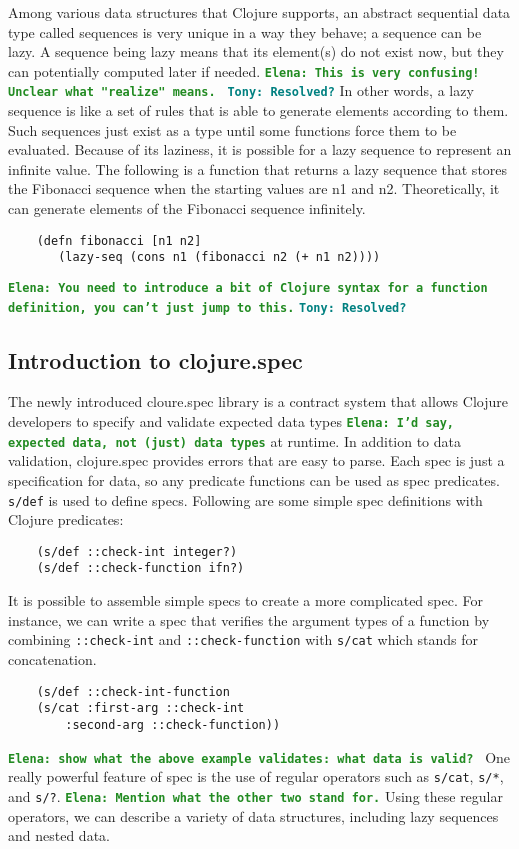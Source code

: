 \documentclass[12pt]{article}
\newcommand{\comment}[1]{{\bf \tt  {#1}}}
\newcommand{\emcomment}[1]{\textcolor{ForestGreen}{\comment{Elena: {#1}}}}
\newcommand{\tscomment}[1]{\textcolor{Teal}{\comment{Tony: {#1}}}}
\begin{document}
	Among various data structures that Clojure supports, an abstract sequential data type called sequences is very unique in 
	a way they behave; a sequence can be lazy. A sequence being lazy means that its element(s) do not exist now, but they 
	can potentially computed later if needed. 
	\emcomment{This is very confusing! Unclear what "realize" means. } \tscomment{Resolved?}
	In other words, a lazy sequence is like a set of rules that is able to generate elements according to them.
	Such sequences just exist as a type until some functions force them to be evaluated. Because of its laziness, it is possible 
	for a lazy sequence to represent an infinite value. The following is a function that returns a lazy sequence that stores the 
	Fibonacci sequence when the starting values are n1 and n2. Theoretically, it can generate elements of the Fibonacci 
	sequence infinitely. 
	\begin{verbatim}
	(defn fibonacci [n1 n2]
	   (lazy-seq (cons n1 (fibonacci n2 (+ n1 n2))))
	\end{verbatim}
	\emcomment{You need to introduce a bit of Clojure syntax for a function definition, you can't just jump to this.}
	\tscomment{Resolved?}
	
	\subsection{Introduction to clojure.spec}
	The newly introduced cloure.spec library is a contract system that allows Clojure developers to specify and validate expected data 
	types \emcomment{I'd say, expected data, not (just) data types} at runtime. In addition to data validation, clojure.spec provides errors that are easy to parse. Each spec is just a 				 
	specification for data, so any predicate functions can be used as spec predicates. \texttt{s/def} is used to define specs. Following are 
	some simple spec definitions with Clojure predicates:
	\begin{verbatim}
	(s/def ::check-int integer?)
	(s/def ::check-function ifn?)
	\end{verbatim}
	It is possible to assemble simple specs to create a more complicated spec. For instance, we can write a spec that verifies 
	the argument types of a function by combining \texttt{::check-int} and \texttt{::check-function} with \texttt{s/cat} 
	which stands for concatenation. 
	\begin{verbatim}
	(s/def ::check-int-function 
	(s/cat :first-arg ::check-int
    	:second-arg ::check-function))
	\end{verbatim}
	\emcomment{show what the above example validates: what data is valid? }
	One really powerful feature of spec is the use of regular operators such as \texttt{s/cat}, \texttt{s/*}, and \texttt{s/?}. 
	\emcomment{Mention what the other two stand for.}
	Using 
	these regular operators, we can describe a variety of data structures, including lazy sequences and nested data. 
\end{document}
